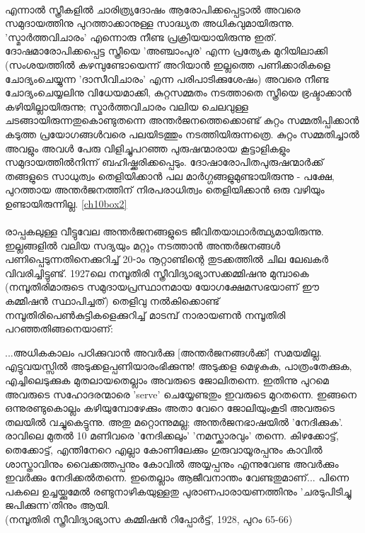 \paragraph{}എന്നാൽ സ്ത്രീകളിൽ ചാരിത്ര്യദോഷം ആരോപിക്കപ്പെട്ടാൽ അവരെ സമുദായത്തിനു പുറത്താക്കാനുള്ള സാദ്ധ്യത അധികവുമായിരുന്നു. 'സ്മാർത്തവിചാരം' എന്നൊരു നീണ്ട പ്രക്രിയയായിരുന്നു ഇത്. ദോഷമാരോപിക്കപ്പെട്ട സ്ത്രീയെ 'അഞ്ചാംപുര' എന്ന പ്രത്യേക മുറിയിലാക്കി (സംശയത്തിൽ കഴമ്പുണ്ടോയെന്ന് അറിയാൻ ഇല്ലത്തെ പണിക്കാരികളെ ചോദ്യംചെയ്യുന്ന 'ദാസീവിചാരം' എന്ന പരിപാടിക്കുശേഷം) അവരെ നീണ്ട ചോദ്യംചെയ്യലിനു വിധേയമാക്കി, കുറ്റസമ്മതം നടത്താതെ സ്ത്രീയെ ഭ്രഷ്ടാക്കാൻ കഴിയില്ലായിരുന്നു; സ്മാർത്തവിചാരം വലിയ ചെലവുള്ള ചടങ്ങായിരുന്നതുകൊണ്ടുതന്നെ അന്തർജനത്തെക്കൊണ്ട് കുറ്റം സമ്മതിപ്പിക്കാൻ കടുത്ത പ്രയോഗങ്ങൾവരെ പലയിടത്തും നടത്തിയിരുന്നത്രെ. കുറ്റം സമ്മതിച്ചാൽ അവളും അവൾ പേരു വിളിച്ചുപറഞ്ഞ പുരുഷന്മാരായ കൂട്ടാളികളും സമുദായത്തിൽനിന്ന് ബഹിഷ്ക്കരിക്കപ്പെടും. ദോഷാരോപിതപുരുഷന്മാർക്ക് തങ്ങളുടെ സാധുത്വം തെളിയിക്കാൻ പല മാർഗ്ഗങ്ങളുമുണ്ടായിരുന്നു - പക്ഷേ, പുറത്തായ അന്തർജനത്തിന് നിരപരാധിത്വം തെളിയിക്കാൻ ഒരു വഴിയും ഉണ്ടായിരുന്നില്ല. \ref{ch10box2}

\paragraph{}രാപ്പകലുള്ള വീട്ടുവേല അന്തർജനങ്ങളുടെ ജീവിതയാഥാർത്ഥ്യമായിരുന്നു. ഇല്ലങ്ങളിൽ വലിയ സദ്യയും മറ്റും നടത്താൻ അന്തർജനങ്ങൾ പണിപ്പെടുന്നതിനെക്കുറിച്ച് 20-ാം നൂറ്റാണ്ടിന്റെ തുടക്കത്തിൽ ചില ലേഖകർ വിവരിച്ചിട്ടുണ്ട്. 1927ലെ നമ്പൂതിരി സ്ത്രീവിദ്യാഭ്യാസക്കമ്മിഷനു മുമ്പാകെ (നമ്പൂതിരിമാരുടെ സമുദായപ്രസ്ഥാനമായ യോഗക്ഷേമസഭയാണ് ഈ കമ്മിഷൻ സ്ഥാപിച്ചത്) തെളിവു നൽകിക്കൊണ്ട് നമ്പൂതിരിപെൺകുട്ടികളെക്കുറിച്ച് മാടമ്പ് നാരായണൻ നമ്പൂതിരി പറഞ്ഞതിങ്ങനെയാണ്:
\begin{tcolorbox}{}
...അധികകാലം പഠിക്കുവാൻ അവർക്കു [അന്തർജനങ്ങൾക്ക്] സമയമില്ല. എട്ടുവയസ്സിൽ അടുക്കളപ്പണിയാരംഭിക്കുന്നു! അടുക്കള മെഴുകുക, പാത്രംതേക്കുക, എച്ചിലെടുക്കുക മുതലായതെല്ലാം അവരുടെ ജോലിതന്നെ. ഇതിന്നു പുറമെ അവരുടെ സഹോദരന്മാരെ 'serve' ചെയ്യേണ്ടതും ഇവരുടെ മുറതന്നെ. ഇങ്ങനെ ഒന്നുരണ്ടുകൊല്ലം കഴിയുമ്പോഴേക്കും അതാ വേറെ ജോലിയുംകൂടി അവരുടെ തലയിൽ വച്ചുകെട്ടുന്നു. അതു മറ്റൊന്നുമല്ല; അന്തർജനഭാഷയിൽ 'നേദിക്കുക'. രാവിലെ മുതൽ 10 മണിവരെ 'നേദിക്കലും' 'നമസ്ക്കാരവും' തന്നെ. കിഴക്കോട്ട്, തെക്കോട്ട്, എന്തിനേറെ എല്ലാ കോണിലേക്കും ഗുരുവായൂരപ്പനും കാവിൽ ശാസ്താവിനും വൈക്കത്തപ്പനും കോവിൽ അയ്യപ്പനും എന്നുവേണ്ട അവർക്കും ഇവർക്കും നേദിക്കൽതന്നെ. ഇതെല്ലാം ആജീവനാന്തം വേണ്ടതുമാണ്... പിന്നെ പകലെ ഉച്ചയ്ക്കുമേൽ രണ്ടുനാഴികയുള്ളതു പുരാണപാരായണത്തിനും 'ചരടുപിടിച്ചു ജപിക്കുന്ന'തിനും ആയി.
\\(നമ്പൂതിരി സ്ത്രീവിദ്യാഭ്യാസ കമ്മിഷൻ റിപ്പോർട്ട്, 1928, പുറം 65-66)
\end{tcolorbox}

